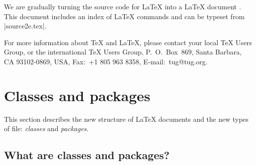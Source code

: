 \documentclass{ltxguide}[1994/11/20]
\begin{document}
We are gradually turning the source code for \LaTeX{} into a \LaTeX{}
document \emph{\sourcecode}.  This document includes an index of
\LaTeX{} commands and can be typeset from |source2e.tex|.
 
For more information about \TeX{} and \LaTeX, please contact your
local \TeX{} Users Group, or the international \TeX{} Users Group,
P.~O.\ Box~869, Santa Barbara, CA 93102-0869, USA, Fax:~+1 805 963
8358, E-mail:~tug@tug.org.
 
\section{Classes and packages}
\label{Sec:class+packages}
 
This section describes the new structure of \LaTeX{} documents and the
new types of file: \emph{classes} and \emph{packages}.
 
\subsection{What are classes and packages?}
 
\end{document}
